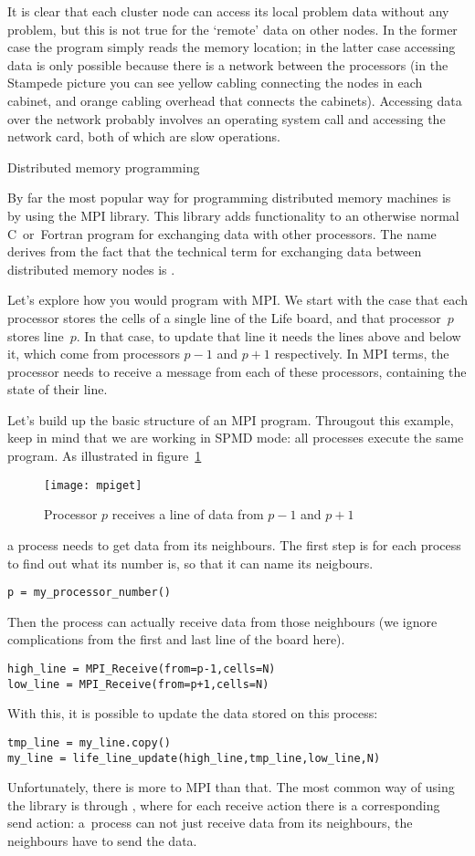 It is clear that each cluster node can access its local
problem data without any problem, but this is not true for the `remote' data
on other nodes.
In the former case the program simply reads the memory location;
in the latter case accessing data is only possible because there is a network
between the processors (in the Stampede picture you can see yellow cabling
connecting the nodes in each cabinet, and orange cabling overhead that connects the cabinets).
Accessing data over the network
probably involves an operating system call and accessing
the network card, both of which are slow operations.

 {Distributed memory programming}
\label{sec:mpi}

By far the most popular way for programming distributed memory
machines is by using the \acf{MPI} library. This library adds
functionality to an otherwise normal C~or~Fortran program for
exchanging data with other processors. The name derives
from the fact that the technical term for
exchanging data between distributed memory nodes
is .

Let's explore how you would program with MPI.
We start with the case that each processor stores the cells
of a single line of the Life board, and that processor~$p$ stores line~$p$.
In that case, to update that line
it needs the lines above and below it, which come from processors $p-1$ and $p+1$
respectively. In MPI terms, the processor needs to receive a message
from each of these processors, containing the state of their line.

Let's build up the basic structure of an MPI program. 
Througout this example, keep in mind that we are working in \ac{SPMD} mode:
all processes execute the same program.
As illustrated in figure~\ref{fig:mpiget}
\begin{figure}[ht]
  \texttt{[image: mpiget]}
  \caption{Processor $p$ receives a line of data from $p-1$ and $p+1$}
  \label{fig:mpiget}
\end{figure}
a process needs to get data from its neighbours. 
The first step is for each process to find out what its number is,
so that it can name its neigbours.
\begin{verbatim}
p = my_processor_number()
\end{verbatim}
Then the process can actually receive data from those neighbours
(we ignore complications from the first and last line of the board here).
\begin{verbatim}
high_line = MPI_Receive(from=p-1,cells=N)
low_line = MPI_Receive(from=p+1,cells=N)
\end{verbatim}
With this, it is possible to update the data stored on this process:
\begin{verbatim}
tmp_line = my_line.copy()
my_line = life_line_update(high_line,tmp_line,low_line,N)
\end{verbatim}
Unfortunately, there is more to MPI than that. The most common way
of using the library is through ,
where for each receive action there is a corresponding send action:
a~process can not just receive data from its neighbours, the neighbours
have to send the data.

